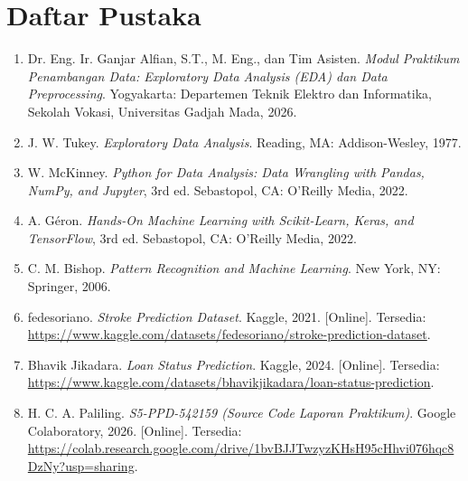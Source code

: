 \chapter{Daftar Pustaka}
\begin{enumerate}
    \item \label{modulPraktikum} Dr. Eng. Ir. Ganjar Alfian, S.T., M. Eng., dan Tim Asisten. \textit{Modul Praktikum Penambangan Data: Exploratory Data Analysis (EDA) dan Data Preprocessing}. Yogyakarta: Departemen Teknik Elektro dan Informatika, Sekolah Vokasi, Universitas Gadjah Mada, 2026.
    
    \item \label{tukey} J. W. Tukey. \textit{Exploratory Data Analysis}. Reading, MA: Addison-Wesley, 1977.
    
    \item \label{mckinney} W. McKinney. \textit{Python for Data Analysis: Data Wrangling with Pandas, NumPy, and Jupyter}, 3rd ed. Sebastopol, CA: O'Reilly Media, 2022.
    
    \item \label{geron} A. Géron. \textit{Hands-On Machine Learning with Scikit-Learn, Keras, and TensorFlow}, 3rd ed. Sebastopol, CA: O'Reilly Media, 2022.
    
    \item \label{bishop} C. M. Bishop. \textit{Pattern Recognition and Machine Learning}. New York, NY: Springer, 2006.
    
    \item \label{kaggleStroke} fedesoriano. \textit{Stroke Prediction Dataset}. Kaggle, 2021. [Online]. Tersedia: \url{https://www.kaggle.com/datasets/fedesoriano/stroke-prediction-dataset}.
    
    \item \label{kaggleLoan} Bhavik Jikadara. \textit{Loan Status Prediction}. Kaggle, 2024. [Online]. Tersedia: \url{https://www.kaggle.com/datasets/bhavikjikadara/loan-status-prediction}.
    
    \item \label{colabLaporan} H. C. A. Paliling. \textit{S5-PPD-542159 (Source Code Laporan Praktikum)}. Google Colaboratory, 2026. [Online]. Tersedia: \url{https://colab.research.google.com/drive/1bvBJJTwzyzKHsH95cHhvi076hqc8DzNy?usp=sharing}.
\end{enumerate}
